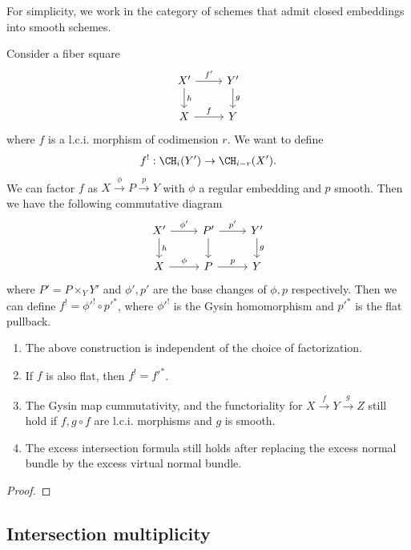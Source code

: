   \begin{construction}
    For simplicity, we work in the category of schemes that admit closed embeddings into smooth schemes.

    Consider a fiber square
    \[
      \begin{tikzcd}
        X' \arrow[r, "f'"] \arrow[d, "h"] & Y' \arrow[d, "g"] \\
        X \arrow[r, "f"] & Y
      \end{tikzcd}
    \]
    where $f$ is a l.c.i. morphism of codimension $r$.
    We want to define 
    \[ f^! : \CH_i(Y') \to \CH_{i-r}(X'). \]
    We can factor $f$ as $X \xrightarrow{\phi} P \xrightarrow{p} Y$ with $\phi$ a regular embedding and $p$ smooth.
    Then we have the following commutative diagram
    \[
      \begin{tikzcd}
        X' \arrow[r, "\phi'"] \arrow[d, "h"] & P' \arrow[r, "p'"] \arrow[d] & Y' \arrow[d, "g"] \\
        X \arrow[r, "\phi"] & P \arrow[r, "p"] & Y
      \end{tikzcd}
    \]
    where $P' = P \times_Y Y'$ and $\phi', p'$ are the base changes of $\phi, p$ respectively.
    Then we can define $f^! = \phi'^! \circ p'^*$, where $\phi'^!$ is the Gysin homomorphism and $p'^*$ is the flat pullback.
  \end{construction}

  \begin{proposition}
    \begin{enumerate}
      \item The above construction is independent of the choice of factorization.
      \item If $f$ is also flat, then $f^! = f'^*$.
      \item The Gysin map cummutativity, and the functoriality for $X \xrightarrow{f} Y \xrightarrow{g} Z$ still hold if $f, g\circ f$ are l.c.i. morphisms and $g$ is smooth.\Yang{}
      \item The excess intersection formula still holds after replacing the excess normal bundle by the excess virtual normal bundle.\Yang{}
    \end{enumerate}
  \end{proposition}
  \begin{proof}
    \Yang{}
  \end{proof}

    
\subsection{Intersection multiplicity}

